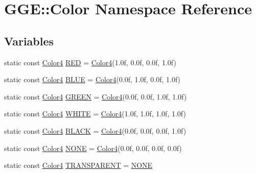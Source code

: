 \hypertarget{namespace_g_g_e_1_1_color}{\section{G\+G\+E\+:\+:Color Namespace Reference}
\label{namespace_g_g_e_1_1_color}
}
\subsection*{Variables}
\begin{DoxyCompactItemize}
\item 
static const \hyperlink{namespace_g_g_e_aff43741fd756c83cbfd5d4d5cd9fcf41}{Color4} \hyperlink{namespace_g_g_e_1_1_color_a98e8bfcace99241c67bc5d1921c459da}{R\+E\+D} = \hyperlink{namespace_g_g_e_aff43741fd756c83cbfd5d4d5cd9fcf41}{Color4}(1.\+0f, 0.\+0f, 0.\+0f, 1.\+0f)
\item 
static const \hyperlink{namespace_g_g_e_aff43741fd756c83cbfd5d4d5cd9fcf41}{Color4} \hyperlink{namespace_g_g_e_1_1_color_a8d6c7c4aee508c3a1181009632277eb3}{B\+L\+U\+E} = \hyperlink{namespace_g_g_e_aff43741fd756c83cbfd5d4d5cd9fcf41}{Color4}(0.\+0f, 1.\+0f, 0.\+0f, 1.\+0f)
\item 
static const \hyperlink{namespace_g_g_e_aff43741fd756c83cbfd5d4d5cd9fcf41}{Color4} \hyperlink{namespace_g_g_e_1_1_color_a26095ccaba67ad0c12df2b8731fa2c1a}{G\+R\+E\+E\+N} = \hyperlink{namespace_g_g_e_aff43741fd756c83cbfd5d4d5cd9fcf41}{Color4}(0.\+0f, 0.\+0f, 1.\+0f, 1.\+0f)
\item 
static const \hyperlink{namespace_g_g_e_aff43741fd756c83cbfd5d4d5cd9fcf41}{Color4} \hyperlink{namespace_g_g_e_1_1_color_a431b29401359e9cb0ecade51b388b2c8}{W\+H\+I\+T\+E} = \hyperlink{namespace_g_g_e_aff43741fd756c83cbfd5d4d5cd9fcf41}{Color4}(1.\+0f, 1.\+0f, 1.\+0f, 1.\+0f)
\item 
static const \hyperlink{namespace_g_g_e_aff43741fd756c83cbfd5d4d5cd9fcf41}{Color4} \hyperlink{namespace_g_g_e_1_1_color_a88f2db25cc7bf1d38ee7fa3d87f01294}{B\+L\+A\+C\+K} = \hyperlink{namespace_g_g_e_aff43741fd756c83cbfd5d4d5cd9fcf41}{Color4}(0.\+0f, 0.\+0f, 0.\+0f, 1.\+0f)
\item 
static const \hyperlink{namespace_g_g_e_aff43741fd756c83cbfd5d4d5cd9fcf41}{Color4} \hyperlink{namespace_g_g_e_1_1_color_aca92af9d049df379ee0b8eb327fe27f6}{N\+O\+N\+E} = \hyperlink{namespace_g_g_e_aff43741fd756c83cbfd5d4d5cd9fcf41}{Color4}(0.\+0f, 0.\+0f, 0.\+0f, 0.\+0f)
\item 
static const \hyperlink{namespace_g_g_e_aff43741fd756c83cbfd5d4d5cd9fcf41}{Color4} \hyperlink{namespace_g_g_e_1_1_color_a20973cadec5f187b10c2789739cd6833}{T\+R\+A\+N\+S\+P\+A\+R\+E\+N\+T} = \hyperlink{namespace_g_g_e_1_1_color_aca92af9d049df379ee0b8eb327fe27f6}{N\+O\+N\+E}
\end{DoxyCompactItemize}


